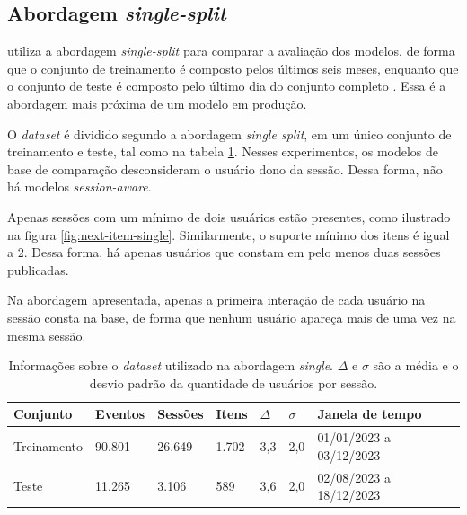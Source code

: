 \subsection{Abordagem \textit{single-split}}

\citet{HidasiKBT15} utiliza a abordagem \textit{single-split} para comparar a
avaliação dos modelos, de forma que o conjunto de treinamento é composto pelos
últimos seis meses, enquanto que o conjunto de teste é composto pelo último dia
do conjunto completo \cite{ludewig_2018}. Essa é a abordagem mais próxima de um
modelo em produção.

O \textit{dataset} é dividido segundo a abordagem \textit{single split}, em um
único conjunto de treinamento e teste, tal como na tabela
\ref{tab:split_data}. Nesses experimentos, os modelos de base de comparação
desconsideram o usuário dono da sessão. Dessa forma, não há modelos
\textit{session-aware}.

Apenas sessões com um mínimo de dois usuários estão presentes, como ilustrado na
figura \ref{fig:next-item-single}. Similarmente, o suporte mínimo dos itens é
igual a 2. Dessa forma, há apenas usuários que constam em pelo menos duas
sessões publicadas.

Na abordagem apresentada, apenas a primeira interação de cada usuário na
sessão consta na base, de forma que nenhum usuário apareça mais de uma vez na
mesma sessão.
  \begin{table}[htbp]
    \centering
    \begin{tabular}{|l|l|l|l|l|l|l|}
      \hline
      Conjunto & Eventos & Sessões & Itens & $\Delta$ & $\sigma$ & Janela de tempo \\ \hline 
         Treinamento & 90.801 & 26.649 & 1.702 & 3,3 & 2,0 & 01/01/2023 a 03/12/2023 \\ \hline
        Teste & 11.265 & 3.106 & 589 & 3,6 & 2,0 & 02/08/2023 a 18/12/2023 \\ \hline
    \end{tabular}
    \caption{Informações sobre o \textit{dataset} utilizado na abordagem
    \textit{single}. $\Delta$ e $\sigma$ são a média e o desvio padrão da quantidade de
    usuários por sessão.}
    \label{tab:split_data}
  \end{table}


